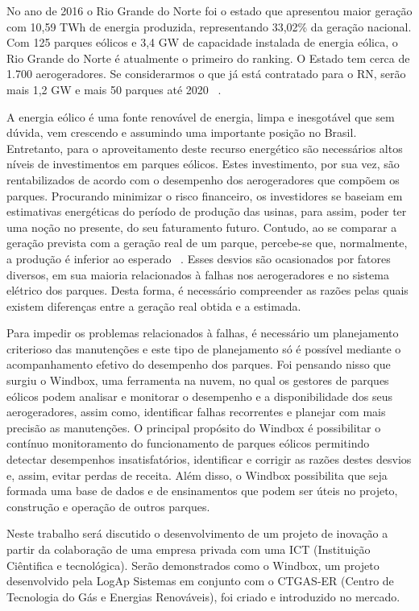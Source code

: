 No ano de 2016 o Rio Grande do Norte foi o estado que apresentou maior geração com 10,59 TWh de energia produzida, representando 33,02\% da geração nacional. Com 125 parques eólicos e 3,4 GW de capacidade instalada de energia eólica, o Rio Grande do Norte é atualmente o primeiro do ranking. O Estado tem cerca de 1.700 aerogeradores. Se considerarmos o que já está contratado para o RN, serão mais 1,2 GW e mais 50 parques até 2020 ~\cite{estados-capacidade-instalada}.

A energia eólico é uma fonte renovável de energia, limpa e inesgotável que sem dúvida, vem crescendo e assumindo uma importante posição no Brasil. Entretanto, para o aproveitamento deste recurso energético são necessários altos níveis de investimentos em parques eólicos. Estes investimento, por sua vez, são rentabilizados de acordo com o desempenho dos aerogeradores que compõem os parques. Procurando minimizar o risco financeiro, os investidores se baseiam em estimativas energéticas do período de produção das usinas, para assim, poder ter uma noção no presente, do seu faturamento futuro. Contudo, ao se comparar a geração prevista com a geração real de um parque, percebe-se que, normalmente, a produção é inferior ao esperado ~\cite{ons2015}. Esses desvios são ocasionados por fatores diversos, em sua maioria relacionados à falhas nos aerogeradores e no sistema elétrico dos parques. Desta forma, é necessário compreender as razões pelas quais existem diferenças entre a geração real obtida e a estimada.

Para impedir os problemas relacionados à falhas, é necessário um planejamento criterioso das manutenções e este tipo de planejamento só é possível mediante o acompanhamento efetivo do desempenho dos parques. Foi pensando nisso que surgiu o Windbox, uma ferramenta na nuvem, no qual os gestores de parques eólicos podem analisar e monitorar o desempenho e a disponibilidade dos seus aerogeradores, assim como, identificar falhas recorrentes e planejar com mais precisão as manutenções. O principal propósito do Windbox é possibilitar o contínuo monitoramento do funcionamento de parques eólicos permitindo detectar desempenhos insatisfatórios, identificar e corrigir as razões destes desvios e, assim, evitar perdas de receita. Além disso, o Windbox possibilita que seja formada uma base de dados e de ensinamentos que podem ser úteis no projeto, construção e operação de outros parques.

Neste trabalho será discutido o desenvolvimento de um projeto de inovação a partir da colaboração de uma empresa privada com uma ICT (Instituição Ciêntifica e tecnológica). Serão demonstrados como o Windbox, um projeto desenvolvido pela LogAp Sistemas em conjunto com o CTGAS-ER (Centro de Tecnologia do Gás e Energias Renováveis), foi criado e introduzido no mercado.

